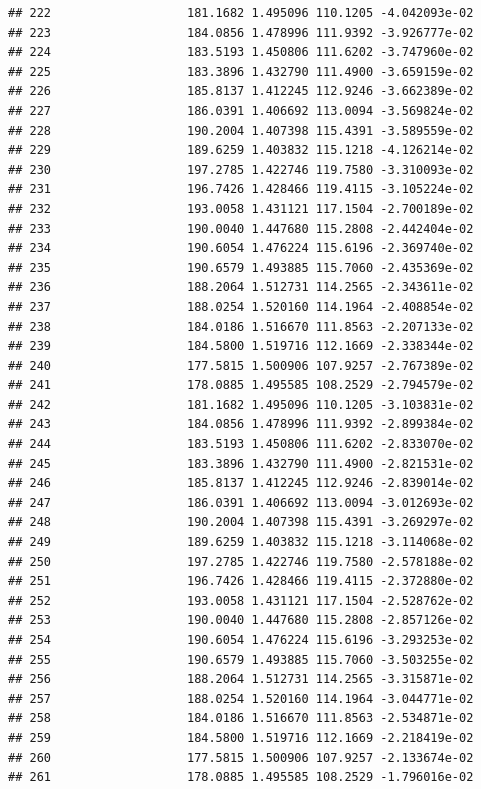 \documentclass[
]{article}
\begin{document}
\begin{verbatim}
## 222                   181.1682 1.495096 110.1205 -4.042093e-02
## 223                   184.0856 1.478996 111.9392 -3.926777e-02
## 224                   183.5193 1.450806 111.6202 -3.747960e-02
## 225                   183.3896 1.432790 111.4900 -3.659159e-02
## 226                   185.8137 1.412245 112.9246 -3.662389e-02
## 227                   186.0391 1.406692 113.0094 -3.569824e-02
## 228                   190.2004 1.407398 115.4391 -3.589559e-02
## 229                   189.6259 1.403832 115.1218 -4.126214e-02
## 230                   197.2785 1.422746 119.7580 -3.310093e-02
## 231                   196.7426 1.428466 119.4115 -3.105224e-02
## 232                   193.0058 1.431121 117.1504 -2.700189e-02
## 233                   190.0040 1.447680 115.2808 -2.442404e-02
## 234                   190.6054 1.476224 115.6196 -2.369740e-02
## 235                   190.6579 1.493885 115.7060 -2.435369e-02
## 236                   188.2064 1.512731 114.2565 -2.343611e-02
## 237                   188.0254 1.520160 114.1964 -2.408854e-02
## 238                   184.0186 1.516670 111.8563 -2.207133e-02
## 239                   184.5800 1.519716 112.1669 -2.338344e-02
## 240                   177.5815 1.500906 107.9257 -2.767389e-02
## 241                   178.0885 1.495585 108.2529 -2.794579e-02
## 242                   181.1682 1.495096 110.1205 -3.103831e-02
## 243                   184.0856 1.478996 111.9392 -2.899384e-02
## 244                   183.5193 1.450806 111.6202 -2.833070e-02
## 245                   183.3896 1.432790 111.4900 -2.821531e-02
## 246                   185.8137 1.412245 112.9246 -2.839014e-02
## 247                   186.0391 1.406692 113.0094 -3.012693e-02
## 248                   190.2004 1.407398 115.4391 -3.269297e-02
## 249                   189.6259 1.403832 115.1218 -3.114068e-02
## 250                   197.2785 1.422746 119.7580 -2.578188e-02
## 251                   196.7426 1.428466 119.4115 -2.372880e-02
## 252                   193.0058 1.431121 117.1504 -2.528762e-02
## 253                   190.0040 1.447680 115.2808 -2.857126e-02
## 254                   190.6054 1.476224 115.6196 -3.293253e-02
## 255                   190.6579 1.493885 115.7060 -3.503255e-02
## 256                   188.2064 1.512731 114.2565 -3.315871e-02
## 257                   188.0254 1.520160 114.1964 -3.044771e-02
## 258                   184.0186 1.516670 111.8563 -2.534871e-02
## 259                   184.5800 1.519716 112.1669 -2.218419e-02
## 260                   177.5815 1.500906 107.9257 -2.133674e-02
## 261                   178.0885 1.495585 108.2529 -1.796016e-02

\end{verbatim}
\end{document}
